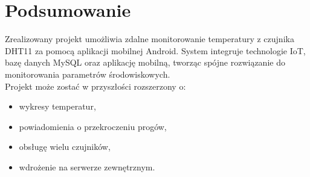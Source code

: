 \chapter*{Podsumowanie}

Zrealizowany projekt umożliwia zdalne monitorowanie temperatury z czujnika DHT11 za pomocą aplikacji mobilnej Android. System integruje technologie IoT, bazę danych MySQL oraz aplikację mobilną, tworząc spójne rozwiązanie do monitorowania parametrów środowiskowych. \\

Projekt może zostać w przyszłości rozszerzony o:
\begin{itemize}
    \item wykresy temperatur,
    \item powiadomienia o przekroczeniu progów,
    \item obsługę wielu czujników,
    \item wdrożenie na serwerze zewnętrznym.
\end{itemize}